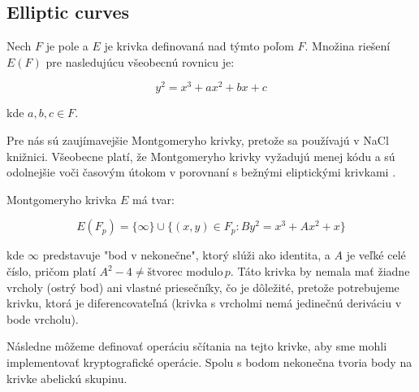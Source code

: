 \subsection{Elliptic curves}

Nech \( F \) je pole a \( E \) je krivka definovaná nad týmto poľom \( F \). Množina riešení \( E(F) \) pre nasledujúcu všeobecnú rovnicu je:

\[
y^2 = x^3 + ax^2 + bx + c
\]

kde \( a, b, c \in F \).

Pre nás sú zaujímavejšie Montgomeryho krivky, pretože sa používajú v NaCl knižnici. Všeobecne platí, že Montgomeryho krivky vyžadujú menej kódu a sú odolnejšie voči časovým útokom v porovnaní s bežnými eliptickými krivkami \cite{OKS00}. 

Montgomeryho krivka \( E \) má tvar:

\[
E(F_p) = \{\infty\} \cup \{(x, y) \in F_p : B y^2 = x^3 + Ax^2 + x \}
\]

kde \( \infty \) predstavuje "bod v nekonečne", ktorý slúži ako identita, a \( A \) je veľké celé číslo, pričom platí \( A^2 - 4 \neq \text{štvorec modulo} \, p \). Táto krivka by nemala mať žiadne vrcholy (ostrý bod) ani vlastné priesečníky, čo je dôležité, pretože potrebujeme krivku, ktorá je diferencovateľná (krivka s vrcholmi nemá jedinečnú deriváciu v bode vrcholu).

Následne môžeme definovať operáciu sčítania na tejto krivke, aby sme mohli implementovať kryptografické operácie. Spolu s bodom nekonečna tvoria body na krivke abelickú skupinu.



